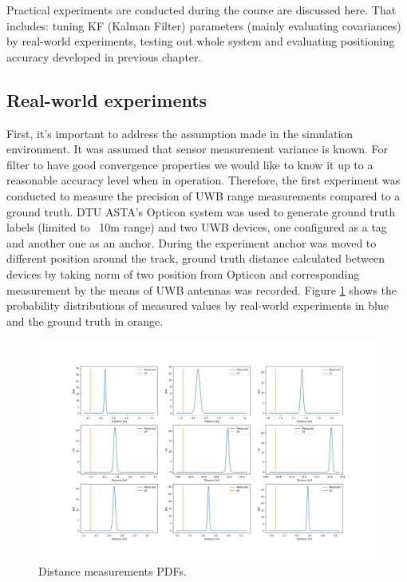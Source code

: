 Practical experiments are conducted during the course are discussed here. That includes: tuning KF (Kalman Filter) parameters (mainly evaluating covariances) by real-world experiments, testing out whole system and evaluating positioning accuracy developed in previous chapter.

\subsection{Real-world experiments}

First, it's important to address the assumption made in the simulation environment. It was assumed that sensor measurement variance is known. For filter to have good convergence properties we would like to know it up to a reasonable accuracy level when in operation. Therefore, the first experiment was conducted to measure the precision of UWB range measurements compared to a ground truth. DTU ASTA's Opticon system was used to generate ground truth labels (limited to ~10m range) and two UWB devices, one configured as a tag and another one as an anchor. During the experiment anchor was moved to different position around the track, ground truth distance calculated between devices by taking norm of two position from Opticon and corresponding measurement by the means of UWB antennas was recorded. Figure \ref{fig:distancePDF} shows the probability distributions of measured values by real-world experiments in blue and the ground truth in orange.
\begin{figure}[H]
    \includegraphics[width=\linewidth]{figures/distancePDF.png}
    \caption{Distance measurements PDFs.}
    \label{fig:distancePDF}
\end{figure}

